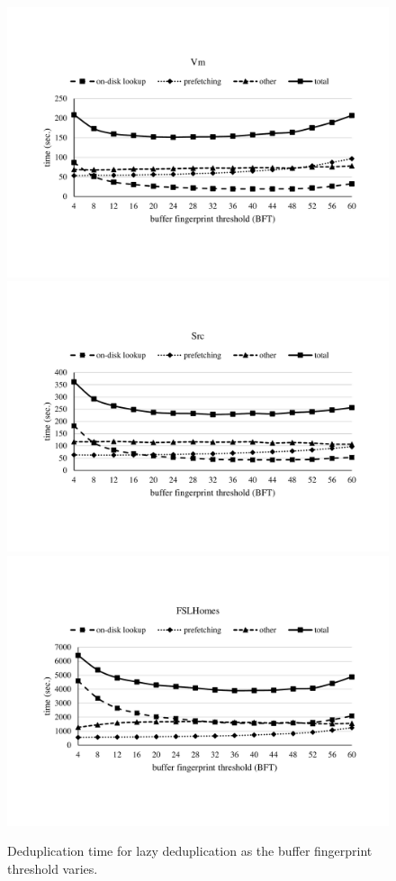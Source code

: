 \documentclass[prodmode,acmtecs]{acmsmall}
\begin{document}
\begin{figure}
\centering

\includegraphics[width=0.8\columnwidth]{bft-vm}
\\[0.5em]

\includegraphics[width=0.8\columnwidth]{bft-src}
\\[0.5em]

\includegraphics[width=0.8\columnwidth]{bft-fslhomes}
\\[0.5em]
\caption{Deduplication time for lazy deduplication as the buffer fingerprint threshold varies.}
\label{fig:bft}
\end{figure}
\end{document}
